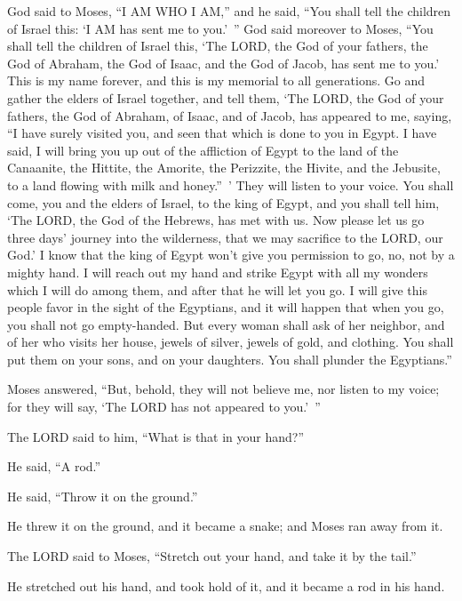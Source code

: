 \myverse{}God said to Moses, “I AM WHO I AM,” and he said, “You shall tell
the children of Israel this: ‘I AM has sent me to you.’ ” \myverse{}God said moreover to Moses, “You shall tell the children of Israel this, ‘The
LORD, the God of your fathers, the God of Abraham, the God of Isaac, and the God of Jacob, has sent me to you.’ This is my name forever, and this is my memorial to all generations. \myverse{}Go and gather the elders of Israel together, and tell them, ‘The LORD, the God of your fathers, the God of Abraham, of Isaac, and of Jacob, has appeared to me, saying, “I have surely visited you, and seen that which is done to you in Egypt. \myverse{}I have said, I will bring you up out of the affliction of Egypt to the land of the Canaanite, the Hittite, the Amorite, the Perizzite, the Hivite, and the Jebusite, to a land flowing with milk and honey.” ’ \myverse{}They will listen to your voice. You shall come, you and the elders of Israel, to the king of Egypt, and you shall tell him, ‘The LORD, the God of the Hebrews, has met with us. Now
please let us go three days’ journey into the wilderness, that we may sacrifice to the LORD, our God.’ \myverse{}I know that the king of Egypt won’t give you permission to go, no, not by a mighty hand. \myverse{}I will reach out my hand and strike Egypt with all my wonders which I will do among them, and after that he will let you go. \myverse{}I will give this people favor in the sight of the Egyptians, and it will happen
that when you go, you shall not go empty-handed. \myverse{}But every woman shall ask of her neighbor, and of her who visits her house, jewels of silver, jewels of gold, and clothing. You shall put them on your sons, and on your daughters. You shall plunder the Egyptians.”


\mychapter{} \myverse*{}Moses answered, “But, behold, they will not believe me, nor listen
to my voice; for they will say, ‘The LORD has not appeared to you.’ ”


\myverse{}The LORD said to him, “What is that in your hand?”

He said, “A rod.”


\myverse{}He said, “Throw it on the ground.”

He threw it on the ground, and it became a snake; and Moses ran away from it.


\myverse{}The LORD said to Moses, “Stretch out your hand, and take it by the tail.”

He stretched out his hand, and took hold of it, and it became a rod in his hand.


